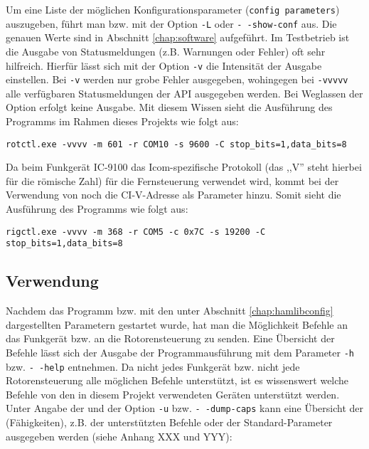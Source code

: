 Um eine Liste der möglichen Konfigurationsparameter (\texttt{config parameters}) auszugeben, führt man  bzw.  mit der Option \texttt{-L} oder \texttt{-\,-show-conf} aus. Die genauen Werte sind in Abschnitt \ref{chap:software} aufgeführt.\newpar
Im Testbetrieb ist die Ausgabe von Statusmeldungen (z.B. Warnungen oder Fehler) oft sehr hilfreich. Hierfür lässt sich mit der Option \texttt{-v} die Intensität der Ausgabe einstellen. Bei \texttt{-v} werden nur grobe Fehler ausgegeben, wohingegen bei \texttt{-vvvvv} alle verfügbaren Statusmeldungen der \ac{API} ausgegeben werden. Bei Weglassen der Option erfolgt keine Ausgabe. Mit diesem Wissen sieht die Ausführung des Programms  im Rahmen dieses Projekts wie folgt aus:

\vspace{-1em}
\begin{shaded}
	\texttt{rotctl.exe -vvvv -m 601 -r COM10 -s 9600 -C stop\_bits=1,data\_bits=8}
\end{shaded}
\vspace{-1em}

\clearpage

Da beim Funkgerät IC-9100 das Icom-spezifische Protokoll  (das ,,V'' steht hierbei für die römische Zahl) für die Fernsteuerung verwendet wird, kommt bei der Verwendung von  noch die CI-V-Adresse als Parameter hinzu. Somit sieht die Ausführung des Programms  wie folgt aus: 

\vspace{-1em}
\begin{shaded}
	\small{\texttt{rigctl.exe -vvvv -m 368 -r COM5 -c 0x7C -s 19200 -C stop\_bits=1,data\_bits=8}}
\end{shaded}

\subsection{Verwendung}

Nachdem das Programm  bzw.  mit den unter Abschnitt \ref{chap:hamlibconfig} dargestellten Parametern gestartet wurde, hat man die Möglichkeit Befehle an das Funkgerät bzw. an die Rotorensteuerung zu senden. Eine Übersicht der Befehle lässt sich der Ausgabe der Programmausführung mit dem Parameter \texttt{-h} bzw. \texttt{-\,-help} entnehmen.\newpar
Da nicht jedes Funkgerät bzw. nicht jede Rotorensteuerung alle möglichen Befehle unterstützt, ist es wissenswert welche Befehle von den in diesem Projekt verwendeten Geräten unterstützt werden. Unter Angabe der  und der Option \texttt{-u} bzw. \texttt{-\,-dump-caps} kann eine Übersicht der  (Fähigkeiten), z.B. der unterstützten Befehle oder der Standard-Parameter ausgegeben werden (siehe Anhang XXX und YYY):

